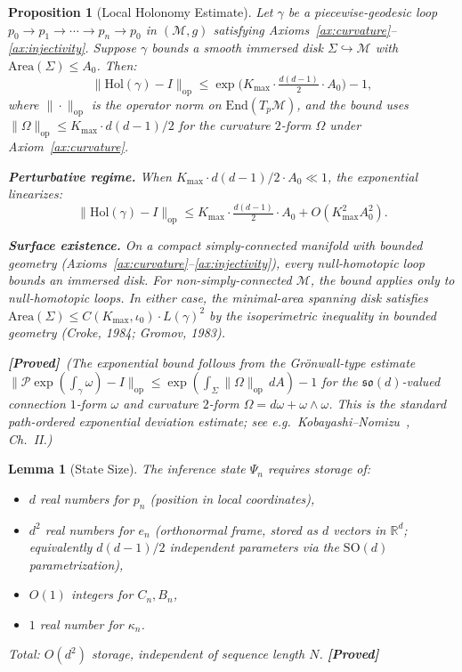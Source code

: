 \documentclass[11pt,a4paper]{article}
\newtheorem{lemma}[theorem]{Lemma}
\newtheorem{proposition}[theorem]{Proposition}
\theoremstyle{definition}
\theoremstyle{remark}
\newcommand{\R}{\mathbb{R}}
\newcommand{\SO}{\mathrm{SO}}
\newcommand{\Hol}{\mathrm{Hol}}
\newcommand{\statusproved}{\textcolor{green!50!black}{\textbf{[Proved]}}}
\begin{document}
\begin{proposition}[Local Holonomy Estimate]\label{prop:hol_bound}
Let $\gamma$ be a piecewise-geodesic loop 
$p_0 \to p_1 \to \cdots \to p_n \to p_0$ in $(\mathcal{M}, g)$ 
satisfying Axioms~\ref{ax:curvature}--\ref{ax:injectivity}. 
Suppose $\gamma$ bounds a smooth immersed disk 
$\Sigma \hookrightarrow \mathcal{M}$ with 
$\mathrm{Area}(\Sigma) \leq A_0$. Then:
\begin{equation}\label{eq:hol_curvature}
    \|\Hol(\gamma) - I\|_{\mathrm{op}} \leq 
    \exp\!\bigl(K_{\max} \cdot \tfrac{d(d-1)}{2} 
    \cdot A_0\bigr) - 1,
\end{equation}
where $\|\cdot\|_{\mathrm{op}}$ is the operator norm on 
$\mathrm{End}(T_p\mathcal{M})$, and the bound uses 
$\|\Omega\|_{\mathrm{op}} \leq K_{\max} \cdot d(d-1)/2$ for 
the curvature $2$-form $\Omega$ under Axiom~\ref{ax:curvature}.

\textbf{Perturbative regime.} When 
$K_{\max} \cdot d(d-1)/2 \cdot A_0 \ll 1$, the exponential 
linearizes:
\begin{equation}\label{eq:hol_linear}
    \|\Hol(\gamma) - I\|_{\mathrm{op}} \leq 
    K_{\max} \cdot \tfrac{d(d-1)}{2} \cdot A_0 
    + O(K_{\max}^2 A_0^2).
\end{equation}

\textbf{Surface existence.} On a compact simply-connected manifold 
with bounded geometry (Axioms~\ref{ax:curvature}--\ref{ax:injectivity}), 
every null-homotopic loop bounds an immersed disk. For non-simply-connected 
$\mathcal{M}$, the bound applies only to null-homotopic loops. 
In either case, the minimal-area spanning disk satisfies 
$\mathrm{Area}(\Sigma) \leq C(K_{\max}, \iota_0) \cdot L(\gamma)^2$ 
by the isoperimetric inequality in bounded geometry 
(Croke, 1984; Gromov, 1983).

\statusproved\ (The exponential bound follows from the 
Gr\"onwall-type estimate 
$\|\mathcal{P}\exp(\int_\gamma \omega) - I\|_{\mathrm{op}} 
\leq \exp(\int_\Sigma \|\Omega\|_{\mathrm{op}}\,dA) - 1$ 
for the $\mathfrak{so}(d)$-valued connection $1$-form $\omega$ 
and curvature $2$-form $\Omega = d\omega + \omega \wedge \omega$. 
This is the standard path-ordered exponential deviation estimate; 
see e.g.\ Kobayashi--Nomizu~\cite{kobayashi1963}, Ch.~II.)
\end{proposition}

\begin{lemma}[State Size]\label{lem:state_size}
The inference state $\Psi_n$ requires storage of:
\begin{itemize}[nosep]
    \item $d$ real numbers for $p_n$ (position in local coordinates),
    \item $d^2$ real numbers for $e_n$ (orthonormal frame, stored as 
    $d$ vectors in $\R^d$; equivalently $d(d-1)/2$ independent 
    parameters via the $\SO(d)$ parametrization),
    \item $O(1)$ integers for $C_n, B_n$,
    \item $1$ real number for $\kappa_n$.
\end{itemize}
Total: $O(d^2)$ storage, independent of sequence length $N$. 
\statusproved
\end{lemma}
\end{document}
